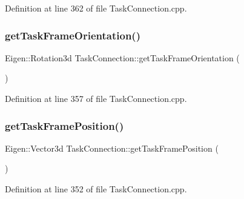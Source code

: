 Definition at line 362 of file Task\+Connection.\+cpp.

\hypertarget{classocra__recipes_1_1TaskConnection_a4163584c89cc8680131bd473b9359ffb}{}\label{classocra__recipes_1_1TaskConnection_a4163584c89cc8680131bd473b9359ffb} 
\subsubsection{\texorpdfstring{get\+Task\+Frame\+Orientation()}{getTaskFrameOrientation()}}
{\footnotesize\ttfamily Eigen\+::\+Rotation3d Task\+Connection\+::get\+Task\+Frame\+Orientation (\begin{DoxyParamCaption}{ }\end{DoxyParamCaption})}



Definition at line 357 of file Task\+Connection.\+cpp.

\hypertarget{classocra__recipes_1_1TaskConnection_a263fc00649e98cfa61393f63cfe9f84a}{}\label{classocra__recipes_1_1TaskConnection_a263fc00649e98cfa61393f63cfe9f84a} 
\subsubsection{\texorpdfstring{get\+Task\+Frame\+Position()}{getTaskFramePosition()}}
{\footnotesize\ttfamily Eigen\+::\+Vector3d Task\+Connection\+::get\+Task\+Frame\+Position (\begin{DoxyParamCaption}{ }\end{DoxyParamCaption})}



Definition at line 352 of file Task\+Connection.\+cpp.

\hypertarget{classocra__recipes_1_1TaskConnection_a3ae346f85c5b8655698630b3f3474886}{}\label{classocra__recipes_1_1TaskConnection_a3ae346f85c5b8655698630b3f3474886} 
